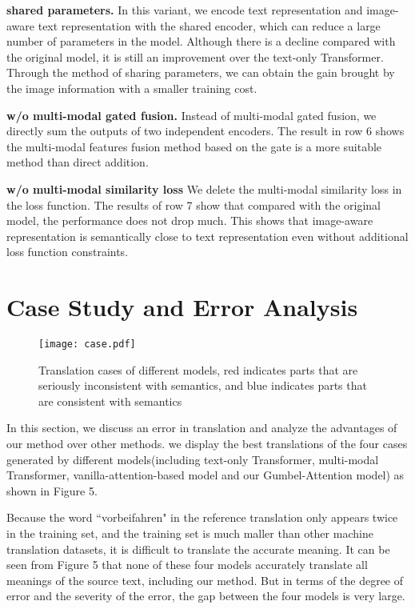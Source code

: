 \documentclass{article}
\begin{document}
\textbf{shared parameters.}
In this variant, we encode text representation and image-aware text representation with the shared encoder, which can reduce a large number of parameters in the model. Although there is a decline compared with the original model, it is still an improvement over the text-only Transformer. Through the method of sharing parameters, we can obtain the gain brought by the image information with a smaller training cost.

\textbf{w/o multi-modal gated fusion.}
Instead of multi-modal gated fusion, we directly sum the outputs of two independent encoders. The result in row 6 shows the multi-modal features fusion method based on the gate is a more suitable method than direct addition.  



\textbf{w/o multi-modal similarity loss}
We delete the multi-modal similarity loss in the loss function. The results of row 7 show that compared with the original model, the performance does not drop much. This shows that image-aware representation is semantically close to text representation even without additional loss function constraints.


\section{Case Study and Error Analysis}

\begin{figure*}[t]
\centering\texttt{[image: case.pdf]}
	\footnotesize\caption{Translation cases of different models, red indicates parts that are seriously inconsistent with semantics, and blue indicates parts that are consistent with semantics} 
	\label{fig:05}
\end{figure*}

In this section, we discuss an error in translation and analyze the advantages of our method over other methods. we display the best translations of the four cases generated by different models(including text-only Transformer, multi-modal Transformer, vanilla-attention-based model and our Gumbel-Attention model) as shown in Figure 5.

Because the word ``vorbeifahren" in the reference translation only appears twice in the training set, and the training set is much maller than other machine translation datasets, it is difficult to translate the accurate meaning. It can be seen from Figure 5 that none of these four models accurately translate all meanings of the source text, including our method. But in terms of the degree of error and the severity of the error, the gap between the four models is very large.
\end{document}
